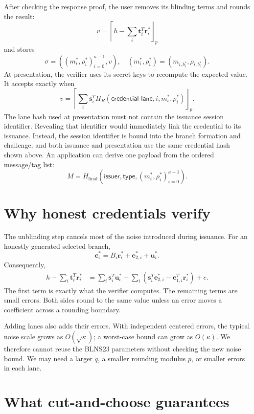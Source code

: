 \documentclass[10pt]{article}
\newcommand{\roundp}[1]{\left\lceil #1\right\rfloor_p}
\begin{document}
After checking the response proof, the user removes its blinding terms and
rounds the result:
\[
 v=\roundp{h-\sum_i\mathbf t_i^T\mathbf r_i^*}
\]
and stores
\[
 \sigma=((m_i^*,\rho_i^*)_{i=0}^{\kappa-1},v),
 \quad (m_i^*,\rho_i^*)=(m_{i,b_i^*},\rho_{i,b_i^*}).
\]
At presentation, the verifier uses its secret keys to recompute the
expected value.  It accepts exactly when
\[
 v=\roundp{\sum_i\mathbf s_i^T
        H_R(\mathsf{credential\mbox{-}lane},i,m_i^*,\rho_i^*)}.
\]
The lane hash used at presentation must not contain the issuance session
identifier.  Revealing that identifier would immediately link the credential
to its issuance.  Instead, the session identifier is bound into the branch
formation and challenge, and both issuance and presentation use the same
credential hash shown above.  An application can derive one payload from the
ordered message/tag list:
\[
 M=H_{\mathrm{final}}(\mathsf{issuer},\mathsf{type},
              (m_i^*,\rho_i^*)_{i=0}^{\kappa-1}).
\]

\section{Why honest credentials verify}

The unblinding step cancels most of the noise introduced during issuance.
For an honestly generated selected branch,
\[
 \mathbf c_i^*=B_i\mathbf r_i^*+\mathbf e_{2,i}^*+\mathbf u_i^*.
\]
Consequently,
\begin{align*}
 h-\sum_i\mathbf t_i^T\mathbf r_i^*
 &=\sum_i\mathbf s_i^T\mathbf u_i^*
   +\sum_i\left(
       \mathbf s_i^T\mathbf e_{2,i}^*
       -\mathbf e_{1,i}^T\mathbf r_i^*\right)+e.
\end{align*}
The first term is exactly what the verifier computes.  The remaining terms
are small errors.  Both sides round to the same value unless an error moves
a coefficient across a rounding boundary.

Adding lanes also adds their errors.  With independent centered errors, the
typical noise scale grows as $O(\sqrt\kappa)$; a worst-case bound can grow
as $O(\kappa)$.  We therefore cannot reuse the BLNS23 parameters without
checking the new noise bound.  We may need a larger $q$, a smaller rounding
modulus $p$, or smaller errors in each lane.

\section{What cut-and-choose guarantees}\label{sec:cut-and-choose}
\end{document}
